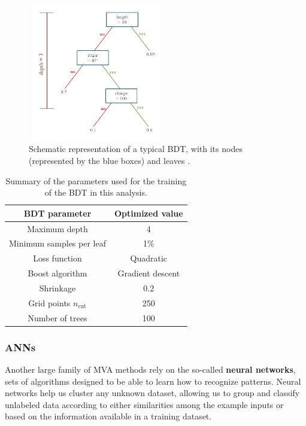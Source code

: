 \documentclass[a4paper, 10pt, openright]{report}
\begin{document}
\begin{figure}[htbp]
\centering
\includegraphics[width=6cm, height=6cm]{figs/BDT.png}
\caption{Schematic representation of a typical \ac{BDT}, with its nodes (represented by the blue boxes) and leaves \cite{FNALBDT}.}
\label{fig:BDT}
\end{figure}

\begin{table}
\begin{center}
\begin{tabular}{ c|c } 
\hline
 BDT parameter & Optimized value \\
 \hline
 Maximum depth & 4 \\
 Minimum samples per leaf & 1\% \\
 Loss function & Quadratic \\
 Boost algorithm & Gradient descent \\
 Shrinkage & 0.2 \\
 Grid points $n_{\text{cut}}$ & 250 \\
 Number of trees & 100 \\
\hline
\end{tabular}
\caption{Summary of the parameters used for the training of the \ac{BDT} in this analysis.}
\label{table:BDT}
\end{center}
\end{table}

\subsubsection{\acfp{ANN}}\label{section:DNN}

Another large family of \ac{MVA} methods rely on the so-called \textbf{neural networks}, sets of algorithms designed to be able to learn how to recognize patterns. Neural networks help us cluster any unknown dataset, allowing us to group and classify unlabeled data according to either similarities among the example inputs or based on the information available in a training dataset.
\end{document}
